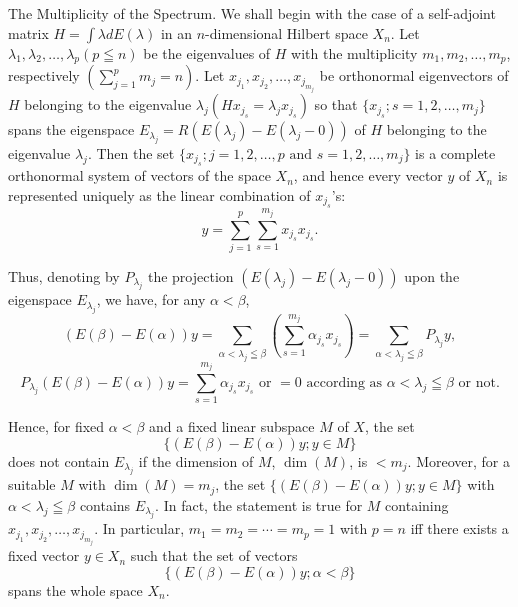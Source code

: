 The Multiplicity of the Spectrum. We shall begin with the case of a self-adjoint matrix $H = \int \lambda dE(\lambda)$ in an $n$-dimensional Hilbert space $X_{n}$. Let $\lambda_1, \lambda_2, \ldots, \lambda_p (p \leqq n)$ be the eigenvalues of $H$ with the multiplicity $m_1, m_2, \ldots, m_p$, respectively $\left( \sum\limits_{j=1}^{p} m_j = n \right)$. Let $x_{j_1}, x_{j_2}, \ldots, x_{j_{m_j}}$ be orthonormal eigenvectors of $H$ belonging to the eigenvalue $\lambda_j (Hx_{j_{s}} = \lambda_j x_{j_{s}})$ so that $\{x_{j_{s}}; s = 1, 2, \ldots, m_j\}$ spans the eigenspace $E_{\lambda_j} = R(E(\lambda_j) - E(\lambda_j - 0))$ of $H$ belonging to the eigenvalue $\lambda_j$. Then the set $\{x_{j_{s}}; j = 1, 2, \ldots, p \text{ and } s = 1, 2, \ldots, m_j\}$ is a complete orthonormal system of vectors of the space $X_n$, and hence every vector $y$ of $X_n$ is represented uniquely as the linear combination of $x_{j_{s}}$'s: 
\begin{equation}\label{eq:XI.8.6}
y = \sum\limits_{j=1} ^{p} \sum\limits_{s=1} ^ {m _{j}} x _ {j _{s}} x _ {j _{s}}.
\end{equation}

Thus, denoting by $P_{\lambda_{j}}$ the projection $(E(\lambda_{j})-E(\lambda_{j}-0))$ upon the eigenspace $E_{\lambda_{j}}$, we have, for any $\alpha<\beta$, 
\begin{equation}\label{eq:XI.8.7}
(E (\beta) - E (\alpha)) y = \sum\limits_ {\alpha < \lambda_{j} \leqq \beta} \left(\sum\limits_{s=1} ^ {m _{j}} \alpha_ {j _{s}} x _ {j _{s}}\right) = \sum\limits_ {\alpha < \lambda_{j} \leqq \beta} P _ {\lambda_{j}} y,
\end{equation}
\begin{equation}\label{eq:XI.8.8}
P_{\lambda_j}(E(\beta) - E(\alpha))y = \sum\limits_{s=1}^{m_j}\alpha_{j_{s}}x_{j_{s}} \text{ or } = 0 \text{ according as } \alpha < \lambda_j\leqq \beta \text{ or not.}
\end{equation}

Hence, for fixed $\alpha < \beta$ and a fixed linear subspace $M$ of $X$, the set 
\[
\{(E (\beta) - E (\alpha)) y; y \in M \}
\]
does not contain $E_{\lambda_j}$ if the dimension of $M$, $\dim(M)$, is $< m_j$. Moreover, for a suitable $M$ with $\dim(M) = m_j$, the set $\{(E(\beta) - E(\alpha))y; y \in M\}$ with $\alpha < \lambda_j \leqq \beta$ contains $E_{\lambda_j}$. In fact, the statement is true for $M$ containing $x_{j_1}, x_{j_2}, \ldots, x_{j_{m_j}}$. In particular, $m_1 = m_2 = \cdots = m_p = 1$ with $p = n$ iff there exists a fixed vector $y \in X_n$ such that the set of vectors 
\[
\{(E (\beta) - E (\alpha)) y; \alpha < \beta \}
\]
spans the whole space $X_{n}$. 

